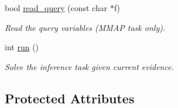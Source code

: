 \begin{DoxyCompactItemize}
bool \hyperlink{classMerlin_a9c327f4e08e338362e869c5d6a05690d}{read\+\_\+query} (const char $\ast$f)
\begin{DoxyCompactList}\small\item\em Read the query variables (M\+M\+A\+P task only). \end{DoxyCompactList}\item 
int \hyperlink{classMerlin_a5c26ff2b1f8471e270790b1611984c70}{run} ()
\begin{DoxyCompactList}\small\item\em Solve the inference task given current evidence. \end{DoxyCompactList}\end{DoxyCompactItemize}
\subsection*{Protected Attributes}
